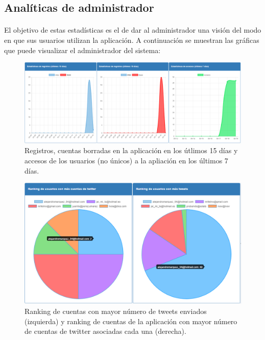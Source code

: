 \documentclass[a4paper]{article}
\begin{document}
	\subsection{Analíticas de administrador}
	
		\paragraph{} El objetivo de estas estadísticas es el de dar al administrador una visión del modo en que sus usuarios utilizan la aplicación. A continuación se muestran las gráficas que puede visualizar el administrador del sistema:
		
			\begin{figure}[H]
				\centering
				\includegraphics[width=1\linewidth]{img/altas-bajas-accesos}
				\caption{Registros, cuentas borradas en la aplicación en los útlimos 15 días y accesos de los usuarios (no únicos) a la apliación en los últimos 7 días.}
				\label{fig:altas-bajas-accesos}
			\end{figure}
			
			\begin{figure}[H]
				\centering
				\includegraphics[width=1\linewidth]{img/rankingsAdmin}
				\caption{Ranking de cuentas con mayor número de tweets enviados (izquierda) y ranking de cuentas de la aplicación con mayor número de cuentas de twitter asociadas cada una (derecha).}
				\label{fig:rankingsAdmin}
			\end{figure}
	
\end{document}
